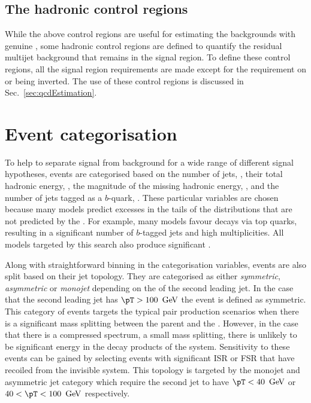\subsection{The hadronic control regions}

While the above control regions are useful for estimating the \SM
backgrounds with genuine \MET, some hadronic control regions are
defined to quantify the residual \QCD multijet background that remains
in the signal region. To define these control regions, all the signal
region requirements are made except for the requirement on \bdphi or
\mhtmet being inverted. The use of these control regions is
discussed in Sec.~\ref{sec:qcdEstimation}.

\section{Event categorisation}
\label{sec:categorisation}

To help to separate signal from background for a wide range of
different signal hypotheses, events are categorised based on the
number of jets, \nj, their total hadronic energy, \HT, the magnitude
of the missing hadronic energy, \MHT, and the number of jets tagged as
a $b$-quark, \nb. These particular variables are chosen because many
\BSM models predict excesses in the tails of the distributions that
are not predicted by the \SM. For example, many \SUSY models favour
decays via top quarks, resulting in a significant number of $b$-tagged
jets and high \nj multiplicities. All \BSM models targeted by this
search also produce significant \MHT.

Along with straightforward binning in the categorisation variables,
events are also split based on their jet topology. They are
categorised as either \emph{symmetric}, \emph{asymmetric} or
\emph{monojet} depending on the \pT of the second leading
jet. In the case that the second leading jet has $\pT>100~\gev$ the
event is defined as symmetric. This category of events targets the
typical \SUSY pair production scenarios when there is a significant
mass splitting between the \SUSY parent and the \LSP. However, in the
case that there is a compressed spectrum, a small mass splitting,
there is unlikely to be significant energy in the \SM decay products
of the \SUSY system. Sensitivity to these events can be gained by
selecting events with significant \ac{ISR} or \ac{FSR} that have
recoiled from the invisible \SUSY system. This topology is targeted by
the monojet and asymmetric jet category which require the second jet
to have $\pT<40~\gev$ or $40<\pT<100~\gev$ respectively.

